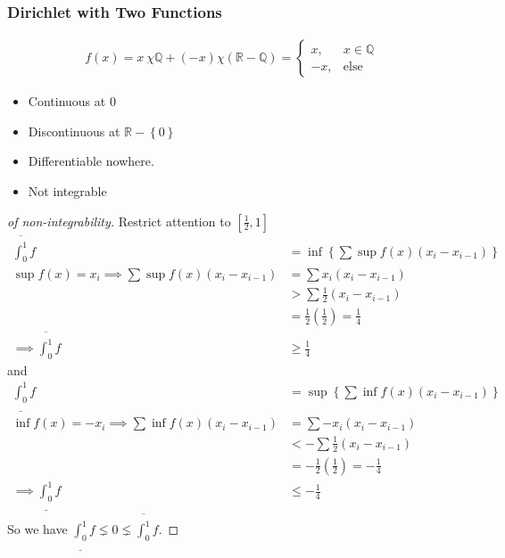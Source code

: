 \hypertarget{dirichlet-with-two-functions}{%
\subsubsection{Dirichlet with Two
Functions}\label{dirichlet-with-two-functions}}

\begin{align*}
f ( x ) = x~\chi{{\mathbb{Q}}} + (-x)\chi({\mathbb{R}}-{\mathbb{Q}}) = \begin{cases}
x, & x\in {\mathbb{Q}}\\
-x, & \text{else}
\end{cases}
\end{align*}

\begin{itemize}
\tightlist
\item
  Continuous at 0
\item
  Discontinuous at \({\mathbb{R}}-\left\{{0}\right\}\)
\item
  Differentiable nowhere.
\item
  Not integrable
\end{itemize}

\begin{proof}[of non-integrability]

Restrict attention to \({\left[ {\frac 1 2, 1} \right]}\)
\begin{align*}
\overline{\int_0^1} f 
&= \inf \left\{{ \sum \sup f(x) (x_i - x_{i-1}) }\right\} \\
\sup f(x) = x_i \implies 
\sum \sup f(x) (x_i - x_{i-1}) &= \sum x_i (x_i - x_{i-1}) \\
&> \sum \frac 1 2 (x_i - x_{i-1}) \\
&= \frac 1 2 \left(\frac 1 2\right) = \frac 1 4 \\
\implies \overline{\int_0^1} f &\geq \frac 1 4
\end{align*}
and
\begin{align*}
\underline{\int_0^1} f 
&= \sup \left\{{ \sum \inf f(x) (x_i - x_{i-1})}\right\} \\
\inf f(x)= -x_i \implies 
\sum \inf f(x) (x_i - x_{i-1}) 
&= \sum -x_i (x_i - x_{i-1}) \\
&< -\sum \frac 1 2 (x_i - x_{i-1}) \\
&= -\frac 1 2 \left( \frac 1 2 \right) = -\frac 1 4 \\
\implies \underline{\int_0^1} f &\leq -\frac 1 4
\end{align*}
So we have
\(\underline{\int_0^1} f \lneq 0 \lneq \overline{\int_0^1} f\).

\end{proof}

